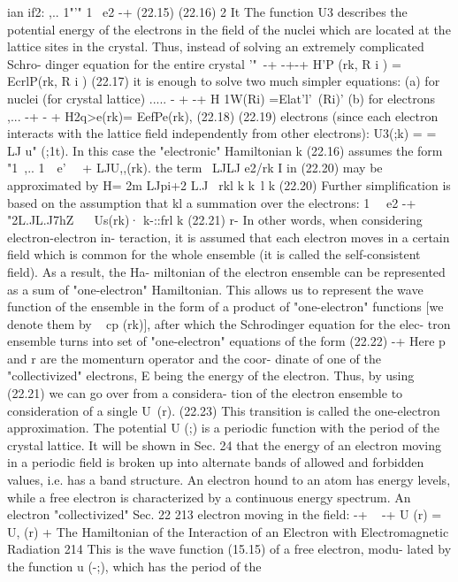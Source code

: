 \documentclass[a4paper,sfsidenotes,colorlinks=true]{tufte-book}
\numberwithin{equation}{section}
\numberwithin{figure}{section}
\begin{document}
{{{{ian if2:
,..
1"'" 1~ e2	-+
(22.15)
(22.16)
2
It The function U3 describes the potential energy of the electrons in the field of the nuclei which are located at the lattice sites in the crystal. Thus, instead of solving an extremely complicated Schro- dinger equation for the entire crystal
'"~-+ -+-+ H'P ({rk},	{R i } )	=	EcrlP({rk},	{R i } )	(22.17)
it is enough to solve two much simpler equations: (a) for nuclei (for crystal lattice)
.....	- +	-+
H 1W({Ri}) =Elat'l'~({Ri})'
(b) for electrons
,...	-+	- + H2q>e({rk})= EefPe({rk}),
(22.18)
(22.19)
electrons (since each electron interacts with the lattice field independently from other electrons): U3({;k}) =
= LJ u" (;1t). In this case the "electronic" Hamiltonian k
(22.16) assumes the form "1~,.. 1~~e'~~
+ LJU,,(rk). the term ~LJLJ e2/rk I in (22.20) may be approximated by
H= 2m LJpi+2 L.J~ rkl k k~l k
(22.20) Further simplification is based on the assumption that
kl
a summation over the electrons: 1~~ e2	-+
"2L.JL.J7hZ~ ~ Us(rk)· k-::frl	k
(22.21)
r-
In other words, when considering electron-electron in- teraction, it is assumed that each electron moves in a certain field which is common for the whole ensemble (it is called the self-consistent field). As a result, the Ha- miltonian of the electron ensemble can be represented as a sum of "one-electron" Hamiltonian. This allows us to represent the wave function of the ensemble in the form of
a product of "one-electron" functions [we denote them by
~
cp (rk)], after which the Schrodinger equation for the elec- tron ensemble turns into set of "one-electron" equations of the form
(22.22)
-+ 
Here p and r are the momenturn operator and the coor- dinate of one of the "collectivized" electrons, E being the energy of the electron. Thus, by using (22.21) we can go over from a considera- tion of the electron ensemble to consideration of a single
U~(r).	(22.23)
This transition is called the one-electron approximation.
The potential U (;) is a periodic function with the period
of the crystal lattice. It will be shown in Sec. 24 that the energy of an electron moving in a periodic field is broken up into alternate bands of allowed and forbidden values, i.e. has a band structure. An electron hound to an atom has energy levels, while a free electron is characterized by a continuous energy spectrum. An electron "collectivized"
Sec. 22	213
electron moving in the field: -+ ~ -+
U (r) = U, (r) +
The Hamiltonian of the Interaction of an Electron with Electromagnetic Radiation
214
This is the wave function (15.15) of a free electron, modu-
lated by the function u (-;), which has the period of the
}}}}
\end{document}
